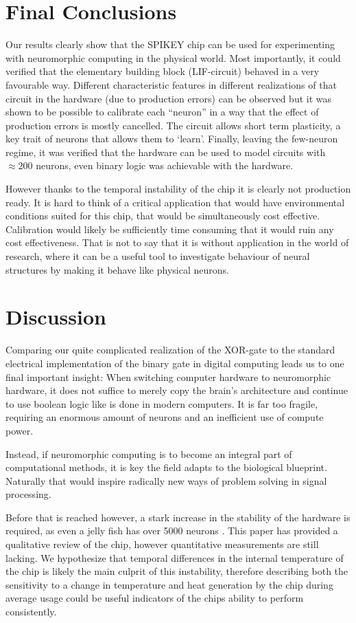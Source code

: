 \documentclass[10pt,a4paper]{article}
\begin{document}
\section{Final Conclusions}
Our results clearly show that the SPIKEY chip can be used for experimenting with
neuromorphic computing in the physical world. Most importantly, it could
verified that the elementary building block (LIF-circuit) behaved in a very
favourable way. Different characteristic features in different realizations of
that circuit in the hardware (due to production errors) can be observed but it
was shown to be possible to calibrate each  ``neuron'' in a way that the effect
of production errors is mostly cancelled. The circuit allows short term
plasticity,  a key trait of neurons that allows them to `learn'.  Finally,
leaving the few-neuron regime, it was verified that the hardware can be used to
model circuits with $\approx 200$ neurons, even binary logic was achievable with
the hardware.

However thanks to the temporal instability of the chip it is clearly not
production ready. It is hard to think of a critical application that would have
environmental conditions suited for this chip, that would be simultaneously cost
effective. Calibration would likely be sufficiently time consuming that it would
ruin any cost effectiveness. That is not to say that it is without application
in the world of research, where it can be a useful tool to investigate behaviour
of neural structures by making it behave like physical neurons.

\section{Discussion}
Comparing our quite complicated realization of the XOR-gate to the standard
electrical implementation of the binary gate in digital computing leads us to
one final important insight: When switching computer hardware to neuromorphic
hardware, it does not suffice to merely copy the brain's architecture and
continue to use boolean logic like is done in modern computers. It is far too
fragile, requiring an enormous amount of neurons and an inefficient use of
compute power.

Instead, if neuromorphic computing is to become an integral part of
computational methods, it is key the field adapts to the biological blueprint.
Naturally that would inspire radically new ways of problem solving in signal
processing.

Before that is reached however, a stark increase in the stability of the
hardware is required, as even a jelly fish has over 5000 neurons
\cite{neuronsjellyfish}. This paper has provided a qualitative review of the
chip, however quantitative measurements are still lacking. We hypothesize that
temporal differences in the internal temperature of the chip is likely the main
culprit of this instability, therefore describing both the sensitivity to a
change in temperature and heat generation by the chip during average usage could
be useful indicators of the chips ability to perform consistently.
\end{document}
